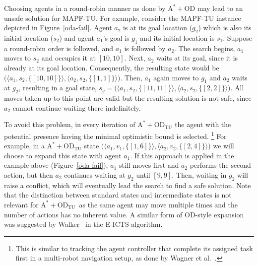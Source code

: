\documentclass[jair,twoside,11pt,theapa]{article}
\newcommand{\tuple}[1]{\langle#1\rangle}
\newcommand{\oda}{$\mathrm{A^{*}+OD}$\xspace}
\newcommand{\odatu}{$\mathrm{A^{*}+OD_{TU}}$\xspace}
\newcommand{\mapftu}{MAPF-TU\xspace}
\begin{document}
Choosing agents in a round-robin manner as done by \oda may lead to an unsafe solution for \mapftu. 
For example, consider the \mapftu instance depicted in Figure~\ref{oda-fail}.
Agent $a_2$ is at its goal location ($g_2$) which is also its initial location ($s_2$) and agent $a_1$'s goal is $g_1$ and its initial location is $s_1$. 
Suppose a round-robin order is followed, and $a_1$ is followed by $a_2$. The search begins, $a_1$ moves to $s_2$ and occupies it at $[10,10]$. 
Next, $a_2$ waits at its goal, since it is already at its goal location. Consequently, the resulting state would be 
$\big(\tuple{a_1, s_2, \{[10,10]\}}, \tuple{a_2, s_2, \{[1,1]\}}\big)$. 
Then, $a_1$ again moves to $g_1$ and $a_2$ waits at $g_2$, resulting in a goal state, 
$s_g = \big(\tuple{a_1, s_2, \{[11,11]\}}, \tuple{a_2, s_2, \{[2,2]\}}\big)$.  
All moves taken up to this point are valid but the resulting solution is not safe, since $a_2$ cannot continue waiting there indefinitely. 


To avoid this problem, in every iteration of \odatu the agent with the potential presence having the minimal optimistic bound is selected.
\footnote{This is similar to tracking the agent controller that complete its assigned task first in a multi-robot navigation setup, as done by Wagner et al.~\citeyear{wagner2016multirobot}.}
For example, in a \odatu state 
$\big(\tuple{a_1, v_1, \{[1,6]\}},\tuple{a_2, v_2, \{[2,4]\}}\big)$ we will choose to expand this state with agent $a_1$. 
If this approach is applied in the example above (Figure~\ref{oda-fail}), $a_1$ still moves first and $a_2$ performs the second action, but then $a_2$ continues waiting at $g_2$ until $[9,9]$. 
Then, waiting in $g_2$ will raise a conflict, which will eventually lead the search to find a safe solution.
Note that the distinction between standard states and intermediate states is not relevant for \odatu\ as the same agent may move multiple times and the number of actions has no inherent value. 
A similar form of OD-style expansion was suggested by Walker~\citeyear{walker2018extended} in the E-ICTS algorithm. 
\end{document}
